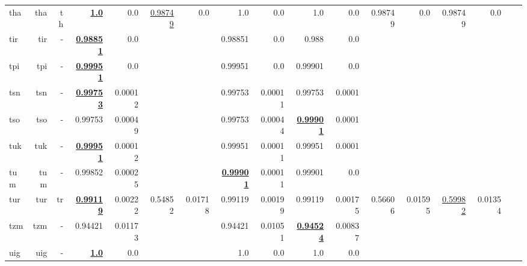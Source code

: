 \documentclass[11pt]{article}
\begin{document}
\begin{table*}[h]
{\begin{tabular}{lrrrrrrrrrrrrrrrr}
tha         & tha         & th         & \textbf{\underline{1.0}}         & 0.0         & \underline{0.98749}         & 0.0         & 1.0         & 0.0         & 1.0         & 0.0         & 0.98749         & 0.0         & 0.98749         & 0.0         \\
tir         & tir         & -         & \textbf{\underline{0.98851}}         & 0.0         &          &          & 0.98851         & 0.0         & 0.988         & 0.0         &          &          &          &          \\
tpi         & tpi         & -         & \textbf{\underline{0.99951}}         & 0.0         &          &          & 0.99951         & 0.0         & 0.99901         & 0.0         &          &          &          &          \\
tsn         & tsn         & -         & \textbf{\underline{0.99753}}         & 0.00012         &          &          & 0.99753         & 0.00011         & 0.99753         & 0.0001         &          &          &          &          \\
tso         & tso         & -         & 0.99753         & 0.00049         &          &          & 0.99753         & 0.00044         & \textbf{\underline{0.99901}}         & 0.0001         &          &          &          &          \\
tuk         & tuk         & -         & \textbf{\underline{0.99951}}         & 0.00012         &          &          & 0.99951         & 0.00011         & 0.99951         & 0.0001         &          &          &          &          \\
tum         & tum         & -         & 0.99852         & 0.00025         &          &          & \textbf{\underline{0.99901}}         & 0.00011         & 0.99901         & 0.0         &          &          &          &          \\
tur         & tur         & tr         & \textbf{\underline{0.99119}}         & 0.00222         & 0.54852         & 0.01718         & 0.99119         & 0.00199         & 0.99119         & 0.00175         & 0.56606         & 0.01595         & \underline{0.59982}         & 0.01354         \\
tzm         & tzm         & -         & 0.94421         & 0.01173         &          &          & 0.94421         & 0.01051         & \textbf{\underline{0.94524}}         & 0.00837         &          &          &          &          \\
uig         & uig         & -         & \textbf{\underline{1.0}}         & 0.0         &          &          & 1.0         & 0.0         & 1.0         & 0.0         &          &          &          &          \\

\end{tabular}}
\end{table*}
\end{document}
